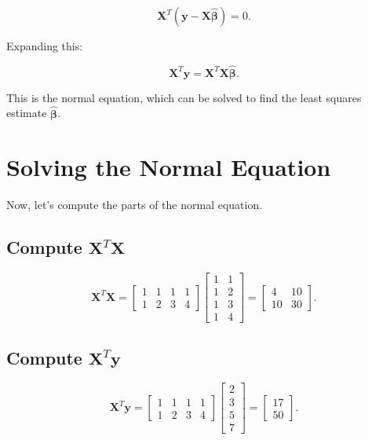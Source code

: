 \begin{equation}
    \mathbf{X}^T (\mathbf{y} - \mathbf{X} \hat{\boldsymbol{\beta}}) = 0.
\end{equation}

Expanding this:

\begin{equation}
    \mathbf{X}^T \mathbf{y} = \mathbf{X}^T \mathbf{X} \hat{\boldsymbol{\beta}}.
\end{equation}

This is the normal equation, which can be solved to find the least squares estimate $\hat{\boldsymbol{\beta}}$.

\section{Solving the Normal Equation}

Now, let's compute the parts of the normal equation.

\subsection{Compute $\mathbf{X}^T \mathbf{X}$}

\begin{equation}
    \mathbf{X}^T \mathbf{X} = \begin{bmatrix}
        1 & 1 & 1 & 1 \\
        1 & 2 & 3 & 4
    \end{bmatrix}
    \begin{bmatrix}
        1 & 1 \\
        1 & 2 \\
        1 & 3 \\
        1 & 4
    \end{bmatrix}
    = \begin{bmatrix}
        4 & 10 \\
        10 & 30
    \end{bmatrix}.
\end{equation}

\subsection{Compute $\mathbf{X}^T \mathbf{y}$}

\begin{equation}
    \mathbf{X}^T \mathbf{y} = \begin{bmatrix}
        1 & 1 & 1 & 1 \\
        1 & 2 & 3 & 4
    \end{bmatrix}
    \begin{bmatrix}
        2 \\
        3 \\
        5 \\
        7
    \end{bmatrix}
    = \begin{bmatrix}
        17 \\
        50
    \end{bmatrix}.
\end{equation}

